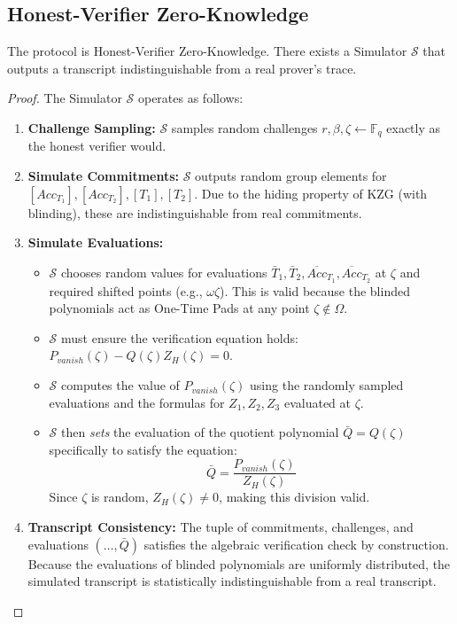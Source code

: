 \subsection{Honest-Verifier Zero-Knowledge}

\begin{theorem}[HVZK]
    The protocol is Honest-Verifier Zero-Knowledge. There exists a Simulator $\mathcal{S}$ that outputs a transcript indistinguishable from a real prover's trace.
\end{theorem}

\begin{proof}
   The Simulator $\mathcal{S}$ operates as follows:

\begin{enumerate}
    \item \textbf{Challenge Sampling:} $\mathcal{S}$ samples random challenges $r, \beta, \zeta \leftarrow \mathbb{F}_q$ exactly as the honest verifier would.
    
    \item \textbf{Simulate Commitments:} $\mathcal{S}$ outputs random group elements for $[Acc_{T_1}], [Acc_{T_2}], [T_1], [T_2]$. Due to the hiding property of KZG (with blinding), these are indistinguishable from real commitments.
    
    \item \textbf{Simulate Evaluations:}
    \begin{itemize}
        \item $\mathcal{S}$ chooses random values for evaluations $\bar{T}_1, \bar{T}_2, \overline{Acc}_{T_1}, \overline{Acc}_{T_2}$ at $\zeta$ and required shifted points (e.g., $\omega\zeta$). This is valid because the blinded polynomials act as One-Time Pads at any point $\zeta \notin \Omega$.
        
        \item $\mathcal{S}$ must ensure the verification equation holds: $P_{vanish}(\zeta) - Q(\zeta)Z_H(\zeta) = 0$.
        
        \item $\mathcal{S}$ computes the value of $P_{vanish}(\zeta)$ using the randomly sampled evaluations and the formulas for $Z_1, Z_2, Z_3$ evaluated at $\zeta$.
        
        \item $\mathcal{S}$ then \textit{sets} the evaluation of the quotient polynomial $\bar{Q} = Q(\zeta)$ specifically to satisfy the equation:
        \[
        \bar{Q} = \frac{P_{vanish}(\zeta)}{Z_H(\zeta)}
        \]
        Since $\zeta$ is random, $Z_H(\zeta) \neq 0$, making this division valid.
    \end{itemize}
    
    \item \textbf{Transcript Consistency:} The tuple of commitments, challenges, and evaluations $(\dots, \bar{Q})$ satisfies the algebraic verification check by construction. Because the evaluations of blinded polynomials are uniformly distributed, the simulated transcript is statistically indistinguishable from a real transcript. 
\end{enumerate}
\end{proof}

